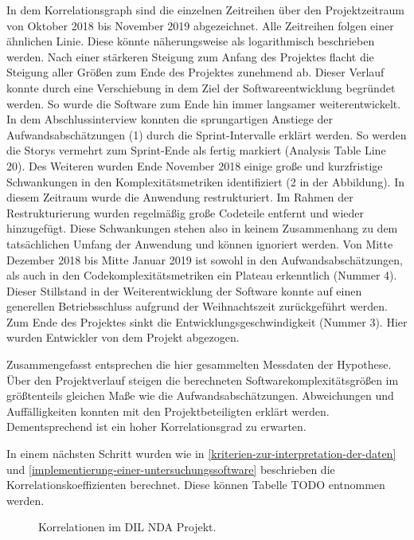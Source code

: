 In dem Korrelationsgraph sind die einzelnen Zeitreihen über den
Projektzeitraum von Oktober 2018 bis November 2019 abgezeichnet. Alle
Zeitreihen folgen einer ähnlichen Linie. Diese könnte näherungsweise als
logarithmisch beschrieben werden. Nach einer stärkeren Steigung zum
Anfang des Projektes flacht die Steigung aller Grö\ss en zum Ende des
Projektes zunehmend ab. Dieser Verlauf konnte durch eine Verschiebung in
dem Ziel der Softwareentwicklung begründet werden. So wurde die Software
zum Ende hin immer langsamer weiterentwickelt. In dem Abschlussinterview
konnten die sprungartigen Anstiege der Aufwandsabschätzungen (1) durch
die Sprint-Intervalle erklärt werden. So werden die Storys vermehrt zum
Sprint-Ende als fertig markiert (Analysis Table Line 20). Des Weiteren
wurden Ende November 2018 einige gro\ss e und kurzfristige Schwankungen in
den Komplexitätsmetriken identifiziert (2 in der Abbildung). In diesem
Zeitraum wurde die Anwendung restrukturiert. Im Rahmen der
Restrukturierung wurden regelmä\ss ig gro\ss e Codeteile entfernt und wieder
hinzugefügt. Diese Schwankungen stehen also in keinem Zusammenhang zu
dem tatsächlichen Umfang der Anwendung und können ignoriert werden. Von
Mitte Dezember 2018 bis Mitte Januar 2019 ist sowohl in den
Aufwandsabschätzungen, als auch in den Codekomplexitätsmetriken ein
Plateau erkenntlich (Nummer 4). Dieser Stillstand in der
Weiterentwicklung der Software konnte auf einen generellen
Betriebsschluss aufgrund der Weihnachtszeit zurückgeführt werden. Zum
Ende des Projektes sinkt die Entwicklungsgeschwindigkeit (Nummer 3).
Hier wurden Entwickler von dem Projekt abgezogen.

Zusammengefasst entsprechen die hier gesammelten Messdaten der
Hypothese. Über den Projektverlauf steigen die berechneten
Softwarekomplexitätsgrö\ss en im grö\ss tenteils gleichen Ma\ss e wie die
Aufwandsabschätzungen. Abweichungen und Auffälligkeiten konnten mit den
Projektbeteiligten erklärt werden. Dementsprechend ist ein hoher
Korrelationsgrad zu erwarten.

In einem nächsten Schritt wurden wie in \ref{kriterien-zur-interpretation-der-daten} und \ref{implementierung-einer-untersuchungssoftware} beschrieben die
Korrelationskoeffizienten berechnet. Diese können Tabelle TODO entnommen
werden.

\begin{figure}\label{dtcnda-correlation-graph}
  \begin{center}
      
  \end{center}
  \caption{Korrelationen im DIL NDA Projekt.}
\end{figure} 

